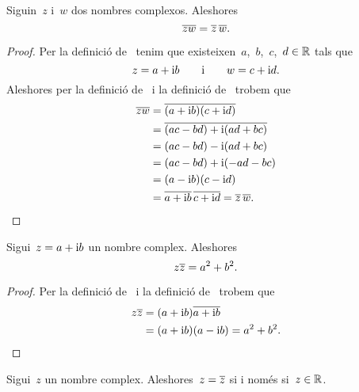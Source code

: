 \documentclass[../Apunts.tex]{subfiles}
\begin{document}
    \begin{proposition}
        \label{prop:el conjugat del producte és el producte de conjugats}
        Siguin~\(z\) i~\(w\) dos nombres complexos.
        Aleshores
        \[\overline{zw}=\overline{z}\,\overline{w}.\]
    \end{proposition}
    \begin{proof}
        Per la definició de~ tenim que
        existeixen~\(a\),~\(b\),~\(c\),~\(d\in\mathbb{R}\) tals que
        \[z=a+\mathrm{i} b\qquad\text{i}\qquad w=c+\mathrm{i} d.\]
        Aleshores per la definició de~
        i la definició de~ trobem que
        \begin{align*}
            \overline{zw}
            &=\overline{(a+\mathrm{i} b)(c+\mathrm{i} d)} \\
            &=\overline{(ac-bd)+\mathrm{i}(ad+bc)} \\
            &=(ac-bd)-\mathrm{i}(ad+bc) \\
            &=(ac-bd)+\mathrm{i}(-ad-bc) \\
            &=(a-\mathrm{i} b)(c-\mathrm{i} d) \\
            &=\overline{a+\mathrm{i} b}\,\overline{c+\mathrm{i} d}
            =\overline{z}\,\overline{w}.
            \qedhere
        \end{align*}
    \end{proof}
    \begin{proposition}
        \label{prop:el producte d'un nombre complex pel seu conjugat és la %
        suma dels quadrats de la seva part real i imaginaria}
        Sigui~\(z=a+\mathrm{i} b\) un nombre complex.
        Aleshores
        \[z\overline{z}=a^{2}+b^{2}.\]
    \end{proposition}
    \begin{proof}
        Per la definició de~ i la
        definició de~ trobem que
        \begin{align*}
            z\overline{z}
            &=(a+\mathrm{i} b)\overline{a+\mathrm{i} b} \\
            &=(a+\mathrm{i} b)(a-\mathrm{i} b)
            =a^{2}+b^{2}.
            \qedhere
        \end{align*}
    \end{proof}
    \begin{proposition}
        \label{prop:un nombre complex és igual al seu conjugat %
        si i només si és un real}
        Sigui~\(z\) un nombre complex.
        Aleshores~\(z=\overline{z}\) si i només si~\(z\in\mathbb{R}\).
    \end{proposition}
\end{document}
